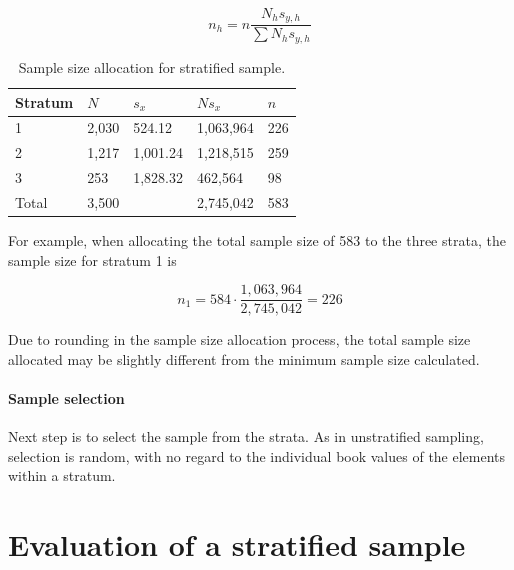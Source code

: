 \begin{equation}
n_h = n \frac{N_h s_{y,h}}{\sum{N_h s_{y,h}}}
\label{eq:sample_allocation}
\end{equation}

\begin{table}[htbp]
\begin{tabularx}{\textwidth}{@{}lYYYY@{}}
\toprule
\parbox[t]{2 cm}{Stratum} &
$N$ &
$s_x$ &
$N s_x$ &
$n$ \\

\midrule

1 & 2,030 & 524.12 & 1,063,964 & 226 \\
2 & 1,217 & 1,001.24 & 1,218,515 & 259 \\
3 & 253 & 1,828.32 & 462,564 & 98 \\

\midrule

Total & 3,500 & & 2,745,042 & 583 \\

\bottomrule
\end{tabularx}
\caption{Sample size allocation for stratified sample.}
\label{tab:sample_allocation}
\end{table}

For example, when allocating the total sample size of 583 to the three strata, the sample size for stratum 1 is

\begin{equation*}
n_1 = 584 \cdot \frac{1,063,964}{2,745,042}= 226
\end{equation*}

Due to rounding in the sample size allocation process, the total sample size allocated may be slightly different from the minimum sample size calculated.

\paragraph{Sample selection} Next step is to select the sample from the strata. As in unstratified sampling, selection is random, with no regard to the individual book values of the elements within a stratum.


\section{Evaluation of a stratified sample} %
\label{sec:evaluation_of_a_stratified_sample}

